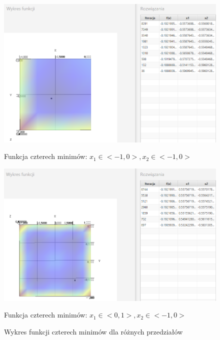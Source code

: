 \documentclass[10pt, a4paper]{article}
\begin{document}
\begin{figure}[htbp]
	\begin{minipage}[b]{1\textwidth}
		\centering
		\includegraphics[width=\linewidth]{images/14e.PNG}
		\caption{Funkcja czterech minimów: $x_{1}\in<-1,0>,  x_{2}\in<-1,0>$}
	\end{minipage}
	\begin{minipage}[b]{1\textwidth}
		\centering
		\includegraphics[width=\linewidth]{images/17e.PNG} 
		\caption{Funkcja czterech minimów: $x_{1}\in<0,1>,  x_{2}\in<-1,0>$}
	\end{minipage}
	\caption{Wykres funkcji czterech minimów dla różnych przedziałów}
	\label{fig:12}
\end{figure}

\pagebreak 
\end{document}
